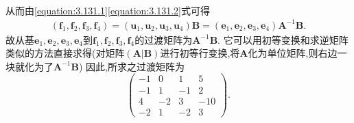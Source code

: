 \documentclass[../../main.tex]{subfiles}%
\begin{document}
\begin{solution}
\begin{align}
\end{align}
从而由\eqref{equation:3.131.1}\eqref{equation:3.131.2}式可得
\begin{align*}
\left( \boldsymbol{f}_1,\boldsymbol{f}_2,\boldsymbol{f}_3,\boldsymbol{f}_4 \right) =\left( \boldsymbol{u}_1,\boldsymbol{u}_2,\boldsymbol{u}_3,\boldsymbol{u}_4 \right) \boldsymbol{B}=\left( \boldsymbol{e}_1,\boldsymbol{e}_2,\boldsymbol{e}_3,\boldsymbol{e}_4 \right) \boldsymbol{A}^{-1}\boldsymbol{B}.
\end{align*}
故从基\(\boldsymbol{e}_1,\boldsymbol{e}_2,\boldsymbol{e}_3,\boldsymbol{e}_4\)到\(\boldsymbol{f}_1,\boldsymbol{f}_2,\boldsymbol{f}_3,\boldsymbol{f}_4\)的过渡矩阵为\(\boldsymbol{A}^{-1}\boldsymbol{B}\). 它可以用初等变换和求逆矩阵类似的方法直接求得(对矩阵\((\boldsymbol{A}|\boldsymbol{B})\)进行初等行变换,将\(\boldsymbol{A}\)化为单位矩阵,则右边一块就化为了\(\boldsymbol{A}^{-1}\boldsymbol{B}\))
因此,所求之过渡矩阵为
\[
\begin{pmatrix}
-1&0&1&5\\
-1&1&-1&2\\
4&-2&3&-10\\
-2&1&-2&3
\end{pmatrix}.
\] 

\end{solution}
\end{document}

